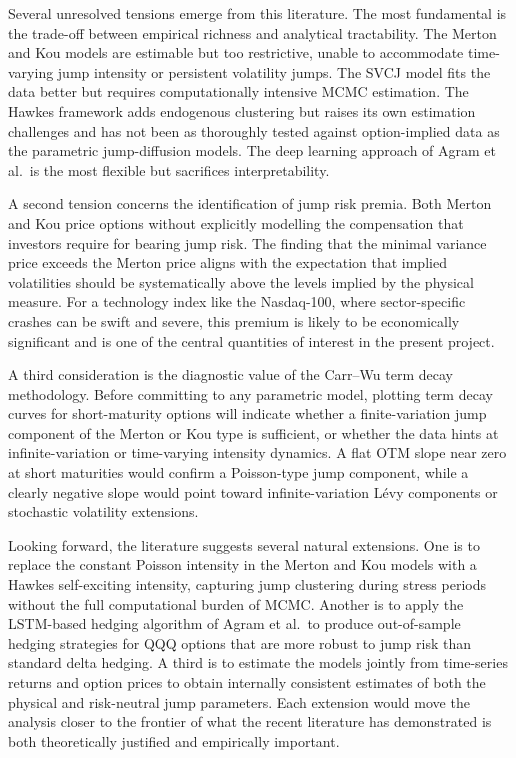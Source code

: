\documentclass[12pt]{article}
\begin{document}
Several unresolved tensions emerge from this literature. The most fundamental is the trade-off between empirical richness and analytical tractability. The Merton and Kou models are estimable but too restrictive, unable to accommodate time-varying jump intensity or persistent volatility jumps. The SVCJ model fits the data better but requires computationally intensive MCMC estimation. The Hawkes framework adds endogenous clustering but raises its own estimation challenges and has not been as thoroughly tested against option-implied data as the parametric jump-diffusion models. The deep learning approach of Agram et al.\ is the most flexible but sacrifices interpretability.

A second tension concerns the identification of jump risk premia. Both Merton and Kou price options without explicitly modelling the compensation that investors require for bearing jump risk. The finding that the minimal variance price exceeds the Merton price aligns with the expectation that implied volatilities should be systematically above the levels implied by the physical measure. For a technology index like the Nasdaq-100, where sector-specific crashes can be swift and severe, this premium is likely to be economically significant and is one of the central quantities of interest in the present project.

A third consideration is the diagnostic value of the Carr--Wu term decay methodology. Before committing to any parametric model, plotting term decay curves for short-maturity options will indicate whether a finite-variation jump component of the Merton or Kou type is sufficient, or whether the data hints at infinite-variation or time-varying intensity dynamics. A flat OTM slope near zero at short maturities would confirm a Poisson-type jump component, while a clearly negative slope would point toward infinite-variation L\'{e}vy components or stochastic volatility extensions.

Looking forward, the literature suggests several natural extensions. One is to replace the constant Poisson intensity in the Merton and Kou models with a Hawkes self-exciting intensity, capturing jump clustering during stress periods without the full computational burden of MCMC. Another is to apply the LSTM-based hedging algorithm of Agram et al.\ to produce out-of-sample hedging strategies for QQQ options that are more robust to jump risk than standard delta hedging. A third is to estimate the models jointly from time-series returns and option prices to obtain internally consistent estimates of both the physical and risk-neutral jump parameters. Each extension would move the analysis closer to the frontier of what the recent literature has demonstrated is both theoretically justified and empirically important.
\end{document}
